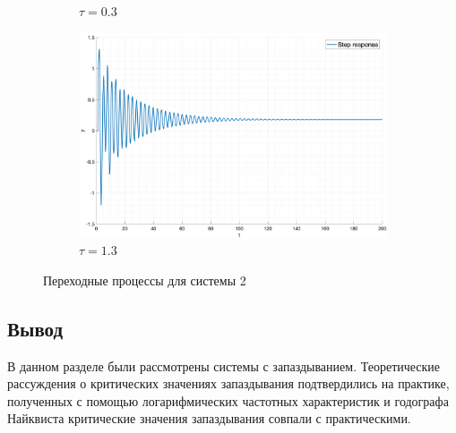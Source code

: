\begin{figure}[ht!]
\begin{subfigure}{0.5\textwidth}
        \caption{$\tau = 0.3$}
    \end{subfigure}
    \begin{subfigure}{0.5\textwidth}
        \centering
        \includegraphics[width=\textwidth]{media/plots/task7_step_response_closed_6.png}
        \caption{$\tau = 1.3$}
    \end{subfigure}
    \caption{Переходные процессы для системы 2}
    \label{fig:task7_step}
\end{figure}


\subsection{Вывод}
В данном разделе были рассмотрены системы с запаздыванием. Теоретические 
рассуждения о критических значениях запаздывания подтвердились на практике, 
полученных с помощью логарифмических частотных характеристик и годографа Найквиста 
критические значения запаздывания совпали с практическими. 